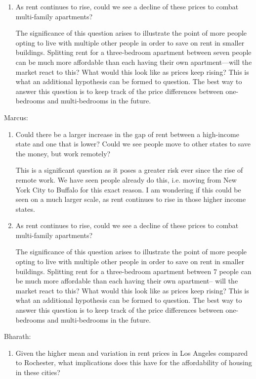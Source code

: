 \documentclass[a4paper]{article}
\begin{document}
\begin{enumerate}
\begin{enumerate}
    \item As rent continues to rise, could we see a decline of these prices to combat multi-family apartments?
    
    The significance of this question arises to illustrate the point of more people opting to live with multiple other people in order to save on rent in smaller buildings. Splitting rent for a three-bedroom apartment between seven people can be much more affordable than each having their own apartment—will the market react to this? What would this look like as prices keep rising? This is what an additional hypothesis can be formed to question. The best way to answer this question is to keep track of the price differences between one-bedrooms and multi-bedrooms in the future.
\end{enumerate}


  Marcus:

  \begin{enumerate}
    \item Could there be a larger increase in the gap of rent between a high-income state and one that is lower? Could we see people move to other states to save the money, but work remotely?
    
    \bigbreak
    This is a significant question as it poses a greater risk ever since the rise of remote work. We have seen people already do this, i.e. moving from New York City to Buffalo for this exact reason. I am wondering if this could be seen on a much larger scale, as rent continues to rise in those higher income states.

    \item As rent continues to rise, could we see a decline of these prices to combat multi-family apartments?
    
    The significance of this question arises to illustrate the point of more people opting to live with multiple other people in order to save on rent in smaller buildings. Splitting rent for a three-bedroom apartment between 7 people can be much more affordable than each having their own apartment-- will the market react to this? What would this look like as prices keep rising? This is what an additional hypothesis can be formed to question. The best way to answer this question is to keep track of the price differences between one-bedrooms and multi-bedrooms in the future.
  \end{enumerate}

  Bharath:

  \begin{enumerate}
    \item Given the higher mean and variation in rent prices in Los Angeles compared to Rochester, what implications does this have for the affordability of housing in these cities? 


\end{enumerate}
\end{enumerate}
\end{document}
